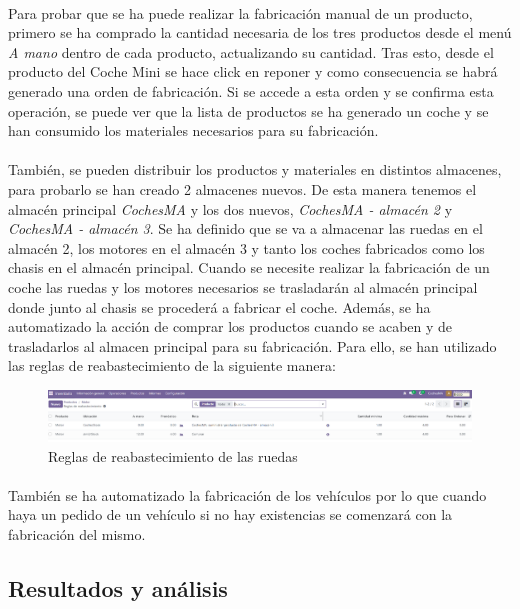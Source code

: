 \paragraph{}
Para probar que se ha puede realizar la fabricación manual de un producto, primero se ha comprado la cantidad necesaria de los tres productos desde el menú \textit{A mano} dentro de cada producto, actualizando su cantidad. Tras esto, desde el producto del Coche Mini se hace click en reponer y como consecuencia se habrá generado una orden de fabricación. Si se accede a esta orden y se confirma esta operación, se puede ver que la lista de productos se ha generado un coche y se han consumido los materiales necesarios para su fabricación. 
\paragraph{}
También, se pueden distribuir los productos y materiales en distintos almacenes, para probarlo se han creado 2 almacenes nuevos. De esta manera tenemos el almacén principal \textit{CochesMA} y los dos nuevos, \textit{CochesMA - almacén 2} y \textit{CochesMA - almacén 3}. Se ha definido que se va a almacenar las ruedas en el almacén 2, los motores en el almacén 3 y tanto los coches fabricados como los chasis en el almacén principal. Cuando se necesite realizar la fabricación de un coche las ruedas y los motores necesarios se trasladarán al almacén principal donde junto al chasis se procederá a fabricar el coche. Además, se ha automatizado la acción de comprar los productos cuando se acaben y de trasladarlos al almacen principal para su fabricación. Para ello, se han utilizado las reglas de reabastecimiento de la siguiente manera:
\begin{figure}[h]
    \centering
    \includegraphics[width=1\linewidth]{fotosGestFab/ruedas.png}
    \caption{Reglas de reabastecimiento de las ruedas}
    \label{fig:enter-label}
\end{figure}
\paragraph{}
También se ha automatizado la fabricación de los vehículos por lo que cuando haya un pedido de un vehículo si no hay existencias se comenzará con la fabricación del mismo. 
\subsection{Resultados y análisis}
